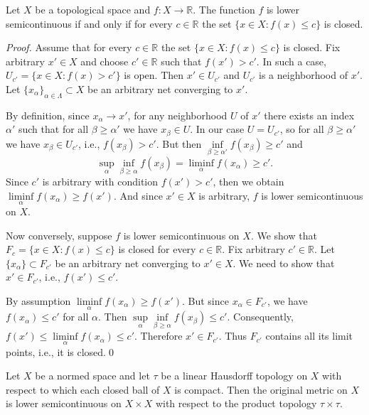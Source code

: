 \documentclass{svproc}
\begin{document}
\begin{proposition}\label{prop:cont_level_0}
Let $X$ be a topological space and $f\colon X\rightarrow \mathbb{R}$. The function $f$ is lower semicontinuous if and only if for every $c\in \mathbb{R}$ the set $\{x\in X\colon f(x) \le c\}$ is closed. 
\end{proposition}

\begin{proof}

Assume that for every $c\in \mathbb{R}$ the set $\{x\in X\colon f(x) \le c\}$ is closed. Fix arbitrary $x'\in X$ and choose $c'\in \mathbb{R}$ such that $f(x') > c'$. In such a case, $U_{c'} = \{x\in X\colon f(x) > c'\}$ is open. Then $x'\in U_{c'}$ and $U_{c'}$ is a neighborhood of $x'$. Let $\{x_{\alpha}\}_{\alpha \in \Lambda}\subset X$ be an arbitrary net converging to $x'$.

By definition, since $x_{\alpha}\rightarrow x'$, for any neighborhood $U$ of $x'$ there exists an index $\alpha'$ such that for all $\beta \ge \alpha'$ we have $x_{\beta}\in U$. In our case $U = U_{c'}$, so for all $\beta \ge \alpha'$ we have $x_{\beta}\in U_{c'}$, i.e., $f(x_{\beta}) > c'$. But then $\inf\limits_{\beta \ge \alpha'} f(x_{\beta}) \ge c'$ and 
$$\sup\limits_{\alpha} \inf\limits_{\beta \ge \alpha} f(x_{\beta}) = \liminf\limits_{\alpha} f(x_{\alpha}) \ge c'.$$ 
Since $c'$ is arbitrary with condition $f(x') > c'$, then we obtain $\liminf\limits_{\alpha} f(x_{\alpha}) \ge f(x')$. And since $x'\in X$ is arbitrary, $f$ is lower semicontinuous on $X$.

Now conversely, suppose $f$ is lower semicontinuous on $X$. We show that $F_c = \{x\in X\colon f(x) \le c\}$ is closed for every $c\in \mathbb{R}$. Fix arbitrary $c'\in \mathbb{R}$. Let $\{x_{\alpha}\}\subset F_{c'}$ be an arbitrary net converging to $x'\in X$. We need to show that $x'\in F_{c'}$, i.e., $f(x')\le c'$. 

By assumption $\liminf\limits_{\alpha} f(x_{\alpha}) \ge f(x')$. But since $x_{\alpha}\in F_{c'}$, we have $f(x_{\alpha})\le c'$ for all $\alpha$. Then $\sup\limits_{\alpha} \inf\limits_{\beta \ge \alpha} f(x_{\beta})\le c'$. Consequently, $f(x')\le \liminf\limits_{\alpha} f(x_{\alpha}) \le c'$. Therefore $x'\in F_{c'}$. Thus $F_{c'}$ contains all its limit points, i.e., it is closed.\qed

\end{proof}

\begin{proposition}\label{prop:semicont_for_dual}
Let $X$ be a normed space and let $\tau$ be a linear Hausdorff topology on $X$ with respect to which each closed ball of $X$ is compact. Then the original metric on $X$ is lower semicontinuous on $X\times X$ with respect to the product topology $\tau\times\tau$.
\end{proposition}
\end{document}
